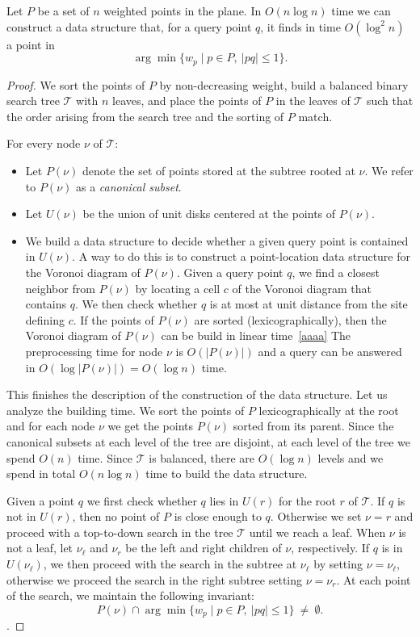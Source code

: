 \documentclass[a4paper,USenglish,numberwithinsect]{lipics}
\newcommand{\T}{\ensuremath{\mathcal{T}}}
\let\le\leqslant
\begin{document}
\begin{lemma}
\label{le:ds2}
	Let $P$ be a set of $n$ weighted points in the plane.
	In $O(n\log n)$ time we can construct a data structure that,
	for a query point $q$, it finds in time $O(\log^2 n)$ a point in
	\[	\arg\min \{ w_p \mid p\in P,~|pq|\le 1\}.
	\]
\end{lemma}
\begin{proof}
	We sort the points of $P$ by non-decreasing weight, build
	a balanced binary search tree $\T$ with $n$ leaves, and place
	the points of $P$ in the leaves of $\T$ such that the order
	arising from the search tree and the sorting of $P$ match.
	
	For every node $\nu$ of $\T$:
	\begin{itemize}
		\item Let $P(\nu)$ denote the set of points stored at the subtree rooted at $\nu$.
			We refer to $P(\nu)$ as a \emph{canonical subset}.
		\item Let $U(\nu)$ be the union of unit disks centered at the points of $P(\nu)$.
		\item We build a data structure to decide whether a given query point
			is contained in $U(\nu)$. A way to do this is to construct
			a point-location data structure for the Voronoi diagram of $P(\nu)$.
			Given a query point $q$, we find a closest neighbor from $P(\nu)$
			by locating a cell $c$ of the Voronoi diagram that contains $q$.
			We then check whether $q$ is at most at unit distance from the site defining $c$. 
			If the points of $P(\nu)$ are sorted (lexicographically),
			then the Voronoi diagram of $P(\nu)$ can be build in linear time~\ref{aaaa}
			The preprocessing time for node $\nu$ is $O(|P(\nu)|)$ and a
			query can be answered in $O(\log |P(\nu)|)= O(\log n)$ time.
	\end{itemize}
	
	This finishes the description of the construction of the data structure.
	Let us analyze the building time. We sort the points of $P$ 
	lexicographically at the root and for each node $\nu$ 
	we get the points $P(\nu)$ sorted from its parent.
	Since the canonical subsets at each level of the tree are disjoint,
	at each level of the tree we spend $O(n)$ time. 
	Since $\T$ is balanced, there are $O(\log n)$ levels and
	we spend in total $O(n\log n)$ time to build the data structure.
	
	Given a point $q$ we first check whether $q$ lies in $U(r)$ for the root $r$ of $\T$.
	If $q$ is not in $U(r)$, then no point of $P$ is close enough to $q$.
	Otherwise we set $\nu=r$ and proceed with a top-to-down search in the tree $\T$ 
	until we reach a leaf. 
	When $\nu$ is not a leaf, 
	let $\nu_\ell$ and $\nu_r$ be the left and right children of $\nu$, respectively. 
	If $q$ is in $U(\nu_\ell)$, we then proceed with the search in the subtree
	at $\nu_\ell$ by setting $\nu=\nu_\ell$,
	otherwise we proceed the search in the right subtree setting $\nu=\nu_r$.
	At each point of the search, we maintain the following invariant:
	\[	P(\nu) \cap \arg\min \{ w_p \mid p\in P,~|pq|\le 1\} ~\not=~ \emptyset.
	\].
	

\end{proof}
\end{document}
